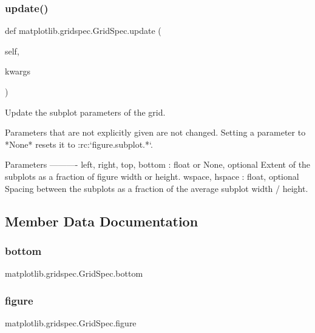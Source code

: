 \subsubsection{\texorpdfstring{update()}{update()}}
{\footnotesize\ttfamily def matplotlib.\+gridspec.\+Grid\+Spec.\+update (\begin{DoxyParamCaption}\item[{}]{self,  }\item[{}]{kwargs }\end{DoxyParamCaption})}

\begin{DoxyVerb}Update the subplot parameters of the grid.

Parameters that are not explicitly given are not changed. Setting a
parameter to *None* resets it to :rc:`figure.subplot.*`.

Parameters
----------
left, right, top, bottom : float or None, optional
    Extent of the subplots as a fraction of figure width or height.
wspace, hspace : float, optional
    Spacing between the subplots as a fraction of the average subplot
    width / height.
\end{DoxyVerb}
 

\subsection{Member Data Documentation}
\mbox{\label{classmatplotlib_1_1gridspec_1_1GridSpec_a4fa176d6ccc57ebf0beebe077042b926}} 
\subsubsection{\texorpdfstring{bottom}{bottom}}
{\footnotesize\ttfamily matplotlib.\+gridspec.\+Grid\+Spec.\+bottom}

\mbox{\label{classmatplotlib_1_1gridspec_1_1GridSpec_afc36985760fb67f8247aaa24a2231212}} 
\subsubsection{\texorpdfstring{figure}{figure}}
{\footnotesize\ttfamily matplotlib.\+gridspec.\+Grid\+Spec.\+figure}


